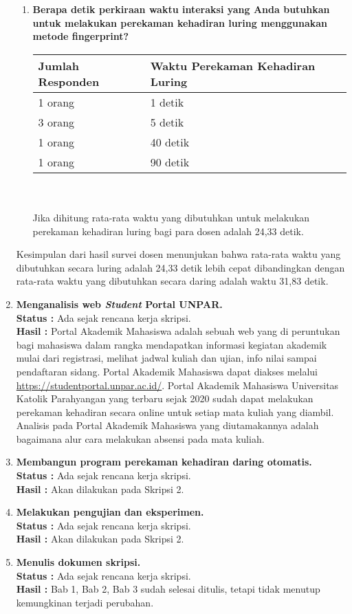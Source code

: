 \documentclass[a4paper,twoside]{article}
\begin{document}
\begin{enumerate}
\begin{enumerate}
			\item \textbf{Berapa detik perkiraan waktu interaksi yang Anda butuhkan untuk melakukan perekaman kehadiran luring menggunakan metode fingerprint?}\\
			\begin{tabular}{|p{4cm} |p{7cm}|}
				\hline
				Jumlah Responden &  Waktu Perekaman Kehadiran Luring \\ \hline     
				1 orang &  1 detik\\ \hline 
				3 orang &  5 detik\\ \hline 
				1 orang &  40 detik\\ \hline 
				1 orang &  90 detik\\ \hline 
			\end{tabular}\\ \\
			Jika dihitung rata-rata waktu yang dibutuhkan untuk melakukan perekaman kehadiran luring bagi para dosen adalah 24,33 detik.
		\end{enumerate}
		Kesimpulan dari hasil survei dosen menunjukan bahwa rata-rata waktu yang dibutuhkan secara luring adalah 24,33 detik lebih cepat dibandingkan dengan rata-rata waktu yang dibutuhkan secara daring adalah waktu 31,83 detik. 
		
		\item \textbf{Menganalisis web \textit{Student} Portal UNPAR.}\\
		{\bf Status :} Ada sejak rencana kerja skripsi.\\
		{\bf Hasil :} Portal Akademik Mahasiswa adalah sebuah web yang di peruntukan bagi mahasiswa dalam rangka mendapatkan informasi kegiatan akademik mulai dari registrasi, melihat jadwal kuliah dan ujian, info nilai sampai pendaftaran sidang. Portal Akademik Mahasiswa dapat diakses melalui \url{https://studentportal.unpar.ac.id/}. Portal Akademik Mahasiswa Universitas Katolik Parahyangan yang terbaru sejak 2020 sudah dapat melakukan perekaman kehadiran secara online untuk setiap mata kuliah yang diambil. Analisis pada Portal Akademik Mahasiswa yang diutamakannya adalah bagaimana alur cara melakukan absensi pada mata kuliah.

		\item \textbf{Membangun program perekaman kehadiran daring otomatis.}\\
		{\bf Status :} Ada sejak rencana kerja skripsi.\\
		{\bf Hasil :} Akan dilakukan pada Skripsi 2.

		\item \textbf{Melakukan pengujian dan eksperimen.}\\
		{\bf Status :} Ada sejak rencana kerja skripsi. \\
		{\bf Hasil :} Akan dilakukan pada Skripsi 2.

		\item \textbf{Menulis dokumen skripsi.} \\
		{\bf Status :} Ada sejak rencana kerja skripsi.\\
		{\bf Hasil :} Bab 1, Bab 2, Bab 3 sudah selesai ditulis, tetapi tidak menutup kemungkinan terjadi perubahan.
		

	\end{enumerate}
\end{document}
